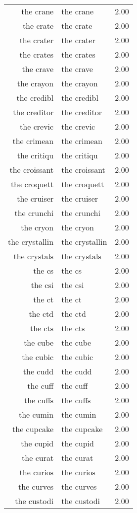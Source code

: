 \begin{table}[ht]
\begin{tabular}{rlr}
  the crane & the crane & 2.00 \\ 
  the crate & the crate & 2.00 \\ 
  the crater & the crater & 2.00 \\ 
  the crates & the crates & 2.00 \\ 
  the crave & the crave & 2.00 \\ 
  the crayon & the crayon & 2.00 \\ 
  the credibl & the credibl & 2.00 \\ 
  the creditor & the creditor & 2.00 \\ 
  the crevic & the crevic & 2.00 \\ 
  the crimean & the crimean & 2.00 \\ 
  the critiqu & the critiqu & 2.00 \\ 
  the croissant & the croissant & 2.00 \\ 
  the croquett & the croquett & 2.00 \\ 
  the cruiser & the cruiser & 2.00 \\ 
  the crunchi & the crunchi & 2.00 \\ 
  the cryon & the cryon & 2.00 \\ 
  the crystallin & the crystallin & 2.00 \\ 
  the crystals & the crystals & 2.00 \\ 
  the cs & the cs & 2.00 \\ 
  the csi & the csi & 2.00 \\ 
  the ct & the ct & 2.00 \\ 
  the ctd & the ctd & 2.00 \\ 
  the cts & the cts & 2.00 \\ 
  the cube & the cube & 2.00 \\ 
  the cubic & the cubic & 2.00 \\ 
  the cudd & the cudd & 2.00 \\ 
  the cuff & the cuff & 2.00 \\ 
  the cuffs & the cuffs & 2.00 \\ 
  the cumin & the cumin & 2.00 \\ 
  the cupcake & the cupcake & 2.00 \\ 
  the cupid & the cupid & 2.00 \\ 
  the curat & the curat & 2.00 \\ 
  the curios & the curios & 2.00 \\ 
  the curves & the curves & 2.00 \\ 
  the custodi & the custodi & 2.00 \\ 

\end{tabular}
\end{table}
